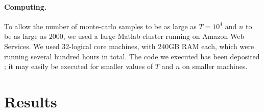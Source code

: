 \documentclass[a4paper,12pt]{article}
\newcommand{\TODO}[1]{ {\tt \color{red} [TODO:#1] } }
\begin{document}

\paragraph{Computing.}

To allow the number of monte-carlo samples to be as large as $T=10^4$ 
and $n$ to be as large as $2000$, we used a large Matlab cluster 
running on Amazon Web Services.
We used 32-logical core machines, with 240GB RAM each, 
which were running several hundred hours in total. 
The code we executed has been
deposited \cite{SDR}; it
may easily be executed for smaller values of $T$ and $n$ on smaller machines.




\section*{Results} \label{sec:results}
\end{document}
